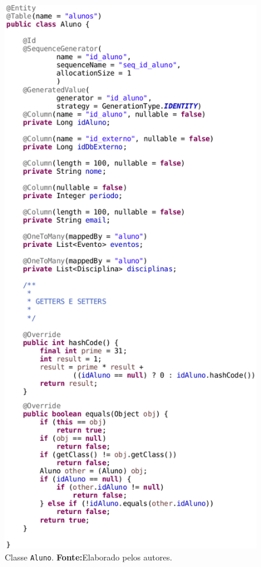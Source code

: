 		\begin{figure}[h!]
			\centerline{\includegraphics[scale=0.7]{./imagens/2_q_metodologico/qm8.png}}
			\caption[Classe \texttt{Aluno}]{Classe \texttt{Aluno}.
			\textbf{Fonte:}Elaborado pelos autores.}
			\label{fig:qm8} 
		\end{figure}
		
